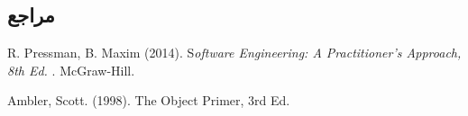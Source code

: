 {\subsection*{مراجع}

\begin{latin}
	\begingroup
	\renewcommand{\section}[2]{}%
	
\begin{thebibliography}{9}

	R. Pressman,   B. Maxim (2014).
	S\textit{oftware Engineering: A Practitioner’s Approach, 8th Ed. }.
	McGraw-Hill.

	Ambler, Scott. (1998). The Object Primer, 3rd Ed.
	 
	
	
\end{thebibliography}
\endgroup
\end{latin}

}

